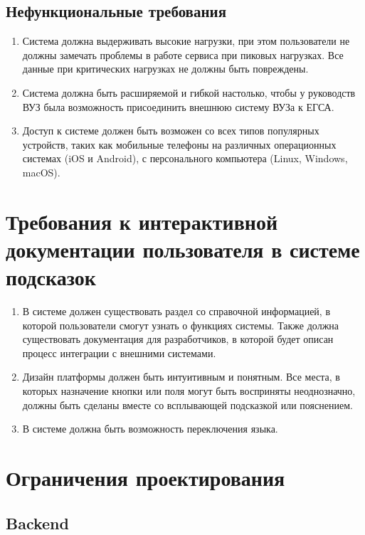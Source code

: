 \documentclass[a4paper, 14pt]{extarticle}
\begin{document}
\subsection{Нефункциональные требования}

\begin{enumerate}[leftmargin=*]
  \item Система должна выдерживать высокие нагрузки, при этом пользователи не
  должны замечать проблемы в работе сервиса при пиковых нагрузках. Все данные
  при критических нагрузках не должны быть повреждены.
  \item Система должна быть расширяемой и гибкой настолько, чтобы у руководств
  ВУЗ была возможность присоединить внешнюю систему ВУЗа к ЕГСА.
  \item Доступ к системе должен быть возможен со всех типов популярных
  устройств, таких как мобильные телефоны на различных операционных системах
  (iOS и Android), с персонального компьютера (Linux, Windows, macOS).
\end{enumerate}


\section{
  Требования к интерактивной документации пользователя в системе подсказок
}

\begin{enumerate}[leftmargin=*]
  \item В системе должен существовать раздел со справочной информацией, в
  которой пользователи смогут узнать о функциях системы. Также должна
  существовать документация для разработчиков, в которой будет описан процесс
  интеграции с внешними системами. 
  \item Дизайн платформы должен быть интуитивным и понятным. Все места, в
  которых назначение кнопки или поля могут быть восприняты неоднозначно, должны
  быть сделаны вместе со всплывающей подсказкой или пояснением.
  \item В системе должна быть возможность переключения языка.
\end{enumerate}

\section{Ограничения проектирования}

\subsection*{Backend}
\end{document}
